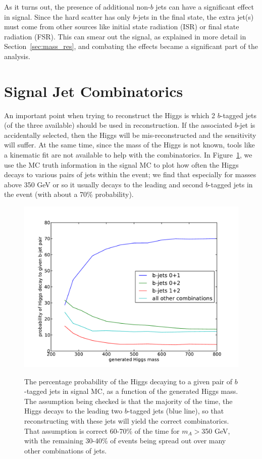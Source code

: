 
As it turns out, the presence of additional non-$b$ jets can have a significant 
effect in signal.  Since the hard scatter has only $b$-jets in the final state, the
extra jet(s) must come from other sources like initial state radiation (ISR) or 
final state radiation (FSR).  This can smear out the signal, as explained in more detail
in Section~\ref{sec:mass_res}, and combating the effects became a significant part of the
analysis.


\section{Signal Jet Combinatorics}
\label{sec:combinatorics}
An important point when trying to reconstruct the Higgs is which 2 $b$-tagged jets (of the
three available) should be used in reconstruction.  If the associated $b$-jet is accidentally
selected, then the Higgs will be mis-reconstructed and the sensitivity will suffer.  At the same time,
since the mass of the Higgs is not known, tools like a kinematic fit are not available to
help with the combinatorics.  In Figure~\ref{fig:combinatorics}, we use the MC truth
information in the signal MC to plot how often the Higgs decays to various pairs of jets
within the event; we find that especially for masses above 350 GeV or so it usually decays to
the leading and second $b$-tagged jets in the event (with about a 70\% probability).
    
\begin{figure}[hbt]
  \includegraphics[width=0.78\linewidth]{SignalKin/combinatorics.pdf}
  \label{fig:combinatorics}
  \caption{The percentage probability of the Higgs decaying to a given pair of $b$-tagged jets in signal MC,
    as a function of the generated Higgs mass.  The assumption being checked is that the majority of
    the time, the Higgs decays to the leading two $b$-tagged jets (blue line), so that reconstructing with these jets
    will yield the correct combinatorics.  That assumption is correct 60-70\% of the time for $m_A>$350 GeV,
    with the remaining 30-40\% of events being spread out over many other combinations of jets.}
\end{figure}
                                                                                                                                    
